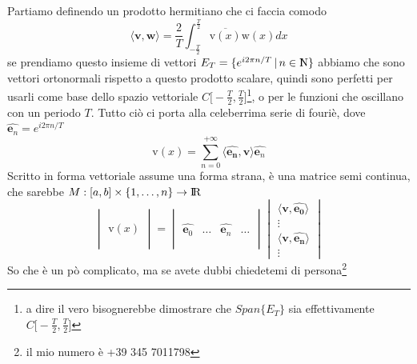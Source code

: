\documentclass[11pt,a4paper]{report}
\newcommand{\vettore}[1]{\mathbf{#1}}
\newcommand{\vettorec}[1]{\textrm{#1}}
\newcommand{\pscal}[2]{\langle \vettore{#1},\vettore{#2}\rangle}
\theoremstyle{definition}
\theoremstyle{plain}
\theoremstyle{plain}
\begin{document}
			Partiamo definendo un prodotto hermitiano che ci faccia comodo
			\begin{equation}
				\pscal{v}{w}=\frac{2}{T}\int_{-\frac{T}{2}}^\frac{T}{2} \overline{\vettorec v(x)}\vettorec w(x)dx
			\end{equation}
			se prendiamo questo insieme di vettori $E_T=\{e^{i2\pi n/ T} \, | \, n \in \rm I\!\! N\}$ abbiamo che sono vettori ortonormali rispetto a questo prodotto scalare, quindi sono perfetti per usarli come base dello spazio vettoriale $C\big[-\frac{T}{2},\frac{T}{2}\big]$\footnote{a dire il vero bisognerebbe dimostrare che $Span\{E_T\}$ sia effettivamente $C\big[-\frac{T}{2},\frac{T}{2}\big]$}, o per le funzioni che oscillano con un periodo $T$.\newline
			Tutto ciò ci porta alla celeberrima serie di fouriè, dove $\widehat{\vettore e_n}=e^{i2\pi n/ T}$
			\begin{equation}
			\label{serieFuriè}
				\vettorec v(x)=\sum_{n=0}^{+\infty} \pscal{\widehat{e_n}}{v}\widehat{\vettore e_n}
			\end{equation}
			Scritto in forma vettoriale assume una forma strana, è una matrice semi continua, che sarebbe $M:[a,b]\times \{1,\dots,n\}\rightarrow \rm I\!R$
			\begin{equation}
				\begin{vmatrix}
					\,\\
					\,\\
					\vettorec v(x)\\
					\,\\
					\,
				\end{vmatrix}
				=
				\begin{vmatrix}
					\, & & &\\
					\, & & &\\
					\widehat{\vettore e_0}& \dots & \widehat{\vettore e_n}&\dots\\
					\, & & &\\
					\, & & &
				\end{vmatrix}
				\begin{vmatrix}
					\pscal{v}{\widehat{e_0}}\\
					\vdots\\
					\pscal{v}{\widehat{e_n}}\\
					\vdots
				\end{vmatrix}
			\end{equation}
			So che è un pò complicato, ma se avete dubbi chiedetemi di persona\footnote{il mio numero è +39 345 7011798}
\end{document}
